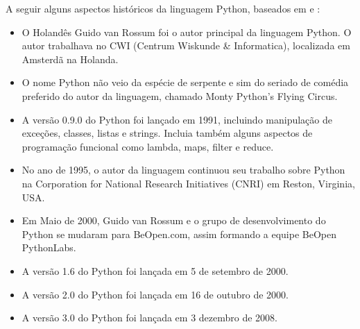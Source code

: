 A seguir alguns aspectos históricos da linguagem Python, baseados em \cite{Perkovic2016} e \cite{Borges2014} :
\begin{itemize}
  \item O Holandês Guido van Rossum foi o autor principal da linguagem Python. O autor trabalhava no CWI (Centrum Wiskunde \& Informatica), localizada em Amsterdã na Holanda.
  \item  O nome Python não veio da espécie de serpente e sim do seriado de comédia preferido do autor da linguagem, chamado Monty Python's Flying Circus.
  \item A versão 0.9.0 do Python foi lançado em 1991, incluindo manipulação de exceções, classes, listas e strings. Incluia também alguns aspectos de programação funcional como lambda, maps, filter e reduce.
  \item  No ano de 1995, o autor da linguagem continuou seu trabalho sobre Python na Corporation for National Research Initiatives (CNRI) em Reston, Virginia, USA.
  \item  Em Maio de 2000, Guido van Rossum e o grupo de desenvolvimento do Python se mudaram para BeOpen.com, assim formando a equipe BeOpen PythonLabs.
  \item A versão 1.6 do Python foi lançada em 5 de setembro de 2000.
  \item A versão 2.0  do Python foi lançada em 16 de outubro de 2000.
  \item A versão 3.0 do Python foi lançada em 3 dezembro de 2008.
\end{itemize}


